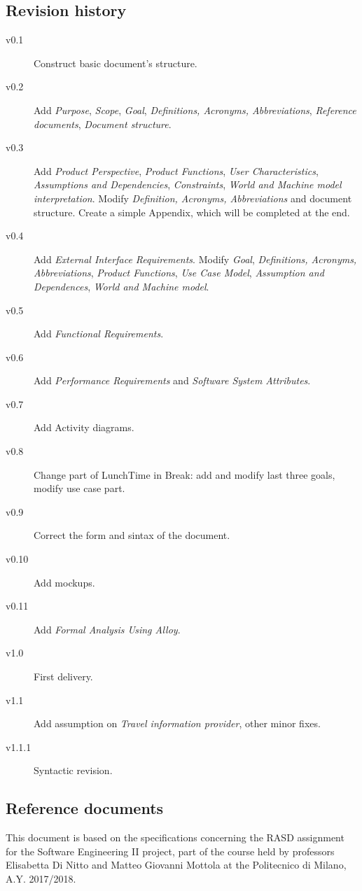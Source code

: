 \documentclass{article}
\begin{document}
	
	\subsection{Revision history}
	\begin{description}
		\item[v0.1] Construct basic document's structure.
		\item[v0.2] Add \textit{Purpose}, \textit{Scope}, \textit{Goal}, \textit{Definitions, Acronyms, Abbreviations}, \textit{Reference documents}, \textit{Document structure}.
		\item[v0.3] Add \textit{Product Perspective}, \textit{Product Functions}, \textit{User Characteristics}, \textit{Assumptions and Dependencies}, \textit{Constraints}, \textit{World and Machine model interpretation}. Modify \textit{Definition, Acronyms, Abbreviations} and document structure. Create a simple Appendix, which will be completed at the end.
		\item[v0.4] Add \textit{External Interface Requirements}. Modify \textit{Goal}, \textit{Definitions, Acronyms, Abbreviations}, \textit{Product Functions}, \textit{Use Case Model}, \textit{Assumption and Dependences}, \textit{World and Machine model}.
		\item[v0.5] Add \textit{Functional Requirements}.
		\item[v0.6] Add \textit{Performance Requirements} and \textit{Software System Attributes}.
		\item[v0.7] Add Activity diagrams.
		\item[v0.8] Change part of LunchTime in Break: add and modify last three goals, modify use case part.
		\item[v0.9] Correct the form and sintax of the document.
		\item[v0.10] Add mockups.
		\item[v0.11] Add \textit{Formal Analysis Using Alloy}.
		\item[v1.0] First delivery.
		\item[v1.1] Add assumption on \textit{Travel information provider}, other minor fixes.
		\item[v1.1.1] Syntactic revision.
	\end{description}
	
	
	\subsection{Reference documents}
	This document is based on the specifications concerning the RASD assignment for the Software Engineering II project, part of the course held by professors Elisabetta Di Nitto and Matteo Giovanni Mottola at the Politecnico di Milano, A.Y. 2017/2018.
	
\end{document}
